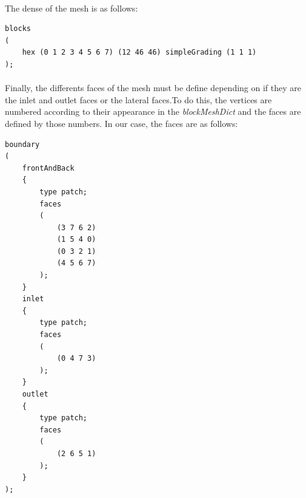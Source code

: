 \paragraph{}The dense of the mesh is as follows:\\
\begin{footnotesize}
\begin{verbatim}
blocks
(
    hex (0 1 2 3 4 5 6 7) (12 46 46) simpleGrading (1 1 1)
);
\end{verbatim}
\end{footnotesize}

\paragraph{}Finally, the differents faces of the mesh must be define depending on if they are the inlet and outlet faces or the lateral faces.To do this, the vertices are numbered according to their appearance in the \textit{blockMeshDict} and the faces are defined by those numbers. In our case, the faces are as follows:\\
\begin{footnotesize}
\begin{verbatim}
boundary
(
    frontAndBack
    {
        type patch;
        faces
        (
            (3 7 6 2)
            (1 5 4 0)
            (0 3 2 1)
            (4 5 6 7)
        );
    }
    inlet
    {
        type patch;
        faces
        (
            (0 4 7 3)
        );
    }
    outlet
    {
        type patch;
        faces
        (
            (2 6 5 1)
        );
    }
);
\end{verbatim}
\end{footnotesize}

